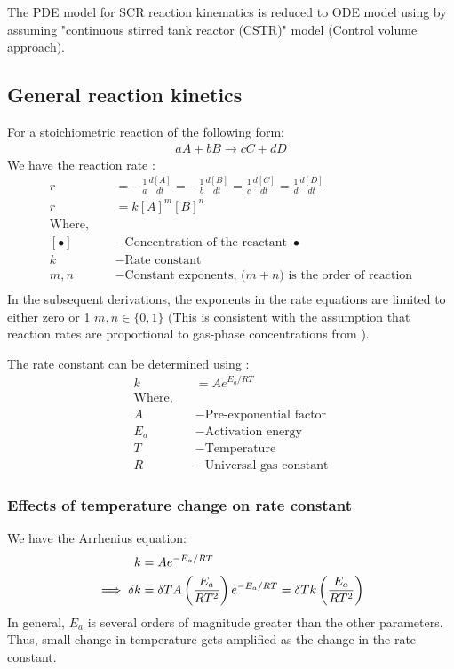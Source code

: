 The PDE model for SCR reaction kinematics \cite{nova2014urea} is reduced to ODE model \cite{devarakonda2008adequacy} using by assuming "continuous stirred tank reactor (CSTR)" model (Control volume approach).


\subsection{General reaction kinetics}
For a stoichiometric reaction of the following form:
\begin{align*}
    a A + b B \longrightarrow c C + d D
\end{align*}
We have the reaction rate \cite{chem_kine}:
\begin{align*}
    r &= -\frac{1}{a} \frac{d [A]}{dt}
       = -\frac{1}{b} \frac{d [B]}{dt}
       = \frac{1}{c}  \frac{d [C]}{dt}
       = \frac{1}{d}  \frac{d [D]}{dt}\\
    r &= k [A]^m [B]^n\\
    \text{Where, }\quad &\\
    [\bullet] &- \text{Concentration of the reactant } \bullet\\
    k &- \text{Rate constant}\\
    m, n &- \text{Constant exponents, ($m+n$) is the order of reaction}\\
\end{align*}
In the subsequent derivations, the exponents in the rate equations are limited
to either zero or 1 $m, n \in \{0, 1\}$ (This is consistent with the assumption
that reaction rates are proportional to gas-phase concentrations from \cite{devarakonda2009model}).

The rate constant can be determined using :
\begin{align*}
    k &= A e^{E_a/RT}\\
    \text{Where,} \quad &\\
    A &- \text{Pre-exponential factor}\\
    E_a &- \text{Activation energy}\\
    T &- \text{Temperature}\\
    R &- \text{Universal gas constant}
\end{align*}
\subsubsection{Effects of temperature change on rate constant}
We have the Arrhenius equation:
\begin{align*}
    k &= A e^{-E_a/RT}\\
    \implies \delta k &= \delta T A \left( \frac{E_a}{RT^2} \right) e^{-E_a/RT} = \delta T k \left( \frac{E_a}{RT^2} \right)\\
\end{align*}
In general, $E_a$ is several orders of magnitude greater than the other
parameters. Thus, small change in temperature gets amplified as the change in
the rate-constant.




